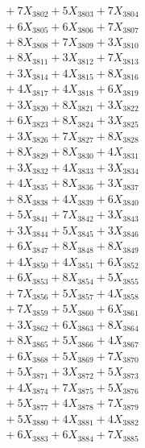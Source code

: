 \documentclass[a4paper,10pt]{article}
\begin{document}
{\begin{align}
&\;  + 7 X_{3802} + 5 X_{3803} + 7 X_{3804} \\[0.3ex]
&\;  + 6 X_{3805} + 6 X_{3806} + 7 X_{3807} \\[0.3ex]
&\;  + 8 X_{3808} + 7 X_{3809} + 3 X_{3810} \\[0.3ex]
&\;  + 8 X_{3811} + 3 X_{3812} + 7 X_{3813} \\[0.3ex]
&\;  + 3 X_{3814} + 4 X_{3815} + 8 X_{3816} \\[0.3ex]
&\;  + 4 X_{3817} + 4 X_{3818} + 6 X_{3819} \\[0.5ex]\allowbreak
&\;  + 3 X_{3820} + 8 X_{3821} + 3 X_{3822} \\[0.3ex]
&\;  + 6 X_{3823} + 8 X_{3824} + 3 X_{3825} \\[0.3ex]
&\;  + 3 X_{3826} + 7 X_{3827} + 8 X_{3828} \\[0.3ex]
&\;  + 8 X_{3829} + 8 X_{3830} + 4 X_{3831} \\[0.3ex]
&\;  + 3 X_{3832} + 4 X_{3833} + 3 X_{3834} \\[0.3ex]
&\;  + 4 X_{3835} + 8 X_{3836} + 3 X_{3837} \\[0.3ex]
&\;  + 8 X_{3838} + 4 X_{3839} + 6 X_{3840} \\[0.3ex]
&\;  + 5 X_{3841} + 7 X_{3842} + 3 X_{3843} \\[0.3ex]
&\;  + 3 X_{3844} + 5 X_{3845} + 3 X_{3846} \\[0.3ex]
&\;  + 6 X_{3847} + 8 X_{3848} + 8 X_{3849} \\[0.5ex]\allowbreak
&\;  + 4 X_{3850} + 4 X_{3851} + 6 X_{3852} \\[0.3ex]
&\;  + 6 X_{3853} + 8 X_{3854} + 5 X_{3855} \\[0.3ex]
&\;  + 7 X_{3856} + 5 X_{3857} + 4 X_{3858} \\[0.3ex]
&\;  + 7 X_{3859} + 5 X_{3860} + 6 X_{3861} \\[0.3ex]
&\;  + 3 X_{3862} + 6 X_{3863} + 8 X_{3864} \\[0.3ex]
&\;  + 8 X_{3865} + 5 X_{3866} + 4 X_{3867} \\[0.3ex]
&\;  + 6 X_{3868} + 5 X_{3869} + 7 X_{3870} \\[0.3ex]
&\;  + 5 X_{3871} + 3 X_{3872} + 5 X_{3873} \\[0.3ex]
&\;  + 4 X_{3874} + 7 X_{3875} + 5 X_{3876} \\[0.3ex]
&\;  + 5 X_{3877} + 4 X_{3878} + 7 X_{3879} \\[0.5ex]\allowbreak
&\;  + 5 X_{3880} + 4 X_{3881} + 4 X_{3882} \\[0.3ex]
&\;  + 6 X_{3883} + 6 X_{3884} + 7 X_{3885} \\[0.3ex]

\end{align}}
\end{document}

